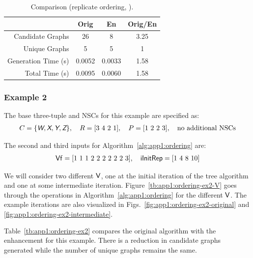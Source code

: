 \begin{table}[!ht]
\centering
\caption{Comparison (replicate ordering, ). \label{tb:app1:ordering-ex1}}
\begin{tabular}{r | c | c | c}
\hline \hline
& Orig & En & Orig/En \\
\hline
Candidate Graphs & 26 & 8 & 3.25 \\
Unique Graphs & 5 & 5 & 1 \\
Generation Time (s) & 0.0052 & 0.0033 & 1.58 \\
Total Time (s) & 0.0095 & 0.0060 & 1.58 \\
\hline \hline
\end{tabular}
\end{table}

\subsubsection{Example 2\label{sec:app1:ordering-ex2}}

The base three-tuple and NSCs for this example are specified as:
\begin{align}
C = \{ \xcolor{W}, \xcolor{X}, \xcolor{Y}, \xcolor{Z}\}, \quad R = [3\ 4\ 2\ 1], \quad P = [1\ 2\ 2\ 3], \quad \text{no additional NSCs}
\end{align}

\noindent The second and third inputs for Algorithm~\ref{alg:app1:ordering} are:
\begin{align}
\textup{\textsf{Vf}} = \text{[1 1 1 2 2 2 2 2 2 3]}, \quad \textup{\textsf{iInitRep}} = \text{[1 4 8 10]}
\end{align}

We will consider two different $\textup{\textsf{V}}$, one at the initial iteration of the tree algorithm and one at some intermediate iteration. Figure~\ref{tb:app1:ordering-ex2-V} goes through the operations in Algorithm~\ref{alg:app1:ordering} for the different $\textup{\textsf{V}}$.
The example iterations are also visualized in Figs.~\ref{fig:app1:ordering-ex2-original} and \ref{fig:app1:ordering-ex2-intermediate}.

Table~\ref{tb:app1:ordering-ex2} compares the original algorithm with the enhancement for this example. There is a reduction in candidate graphs generated while the number of unique graphs remains the same.

